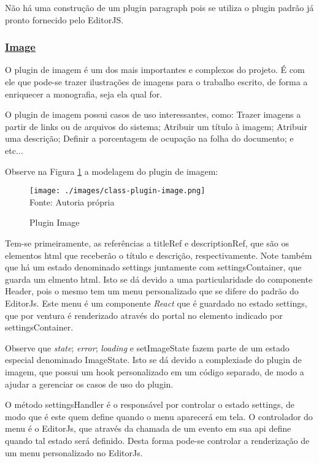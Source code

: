 Não há uma construção de um plugin paragraph pois se utiliza
o plugin padrão já pronto fornecido pelo EditorJS.

\subsubsection{\underline{Image}}

O plugin de imagem é um dos mais importantes e complexos do projeto.
É com ele que pode-se trazer ilustrações de imagens para o trabalho escrito,
de forma a enriquecer a monografia, seja ela qual for.

O plugin de imagem possui casos de uso interessantes, como: Trazer imagens
a partir de links ou de arquivos do sistema; Atribuir um título à imagem;
Atribuir uma descrição; Definir a porcentagem de ocupação na folha do documento;
e etc...


Observe na
Figura \ref{fig:class-plugin-image}
a modelagem do plugin de imagem:

\begin{figure}[H]
    \centering
    \caption{Plugin Image}
    \texttt{[image: ./images/class-plugin-image.png]}
    \label{fig:class-plugin-image} \\
    \textnormal{\fontsize{10pt}{12pt}Fonte: Autoria própria}
\end{figure}

Tem-se primeiramente, as referências a titleRef e descriptionRef, que são
os elementos
\acrshort{html}
que receberão o título e descrição, respectivamente.
Note também que há um estado denominado settings juntamente com settingsContainer,
que guarda um elmento
\acrshort{html}.
Isto se dá devido a uma particularidade do componente Header, pois o mesmo
tem um menu personalizado que se difere do padrão do EditorJs. Este menu é
um componente \textit{React} que é guardado
no estado settings, que por ventura é renderizado através do portal no elemento
indicado por settingsContainer.

Observe que \textit{state}; \textit{error}; \textit{loading} e setImageState fazem parte de um estado especial
denominado ImageState. Isto se dá devido a complexiade do plugin de imagem, que possui
um hook personalizado em um código separado, de modo a ajudar a gerenciar os casos
de uso do plugin.

O método settingsHandler é o responsável por controlar o estado settings, de modo que
é este quem define quando o menu aparecerá em tela. O controlador do menu é o EditorJs,
que através da chamada de um evento em sua
\acrshort{api}
define quando tal estado será definido.
Desta forma pode-se controlar a renderização de um menu personalizado no EditorJs.

